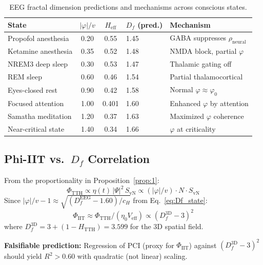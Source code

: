 \documentclass[12pt,a4paper]{article}
\newcommand{\phiTTH}{\Phi_{\mathrm{TTH}}}
\newcommand{\phiIIT}{\Phi_{\mathrm{IIT}}}
\newcommand{\SvN}{S_{\mathrm{vN}}}
\newcommand{\etacoupl}{\eta(t)}
\newcommand{\Hurst}{H_{\mathrm{TTH}}}
\numberwithin{equation}{section}
\begin{document}
\begin{table}[htbp]
\centering
\caption{EEG fractal dimension predictions and mechanisms across conscious states.}
\label{tab:states}
\begin{tabular}{lccll}
\toprule
\textbf{State} & $|\varphi|/v$ & $H_{\mathrm{eff}}$ & $D_f$ (pred.) & \textbf{Mechanism}\\
\midrule
Propofol anesthesia & 0.20 & 0.55 & 1.45 & GABA suppresses $\rho_{\mathrm{neural}}$\\
Ketamine anesthesia & 0.35 & 0.52 & 1.48 & NMDA block, partial $\varphi$\\
NREM3 deep sleep & 0.30 & 0.53 & 1.47 & Thalamic gating off\\
REM sleep & 0.60 & 0.46 & 1.54 & Partial thalamocortical\\
Eyes-closed rest & 0.90 & 0.42 & 1.58 & Normal $\varphi \approx \varphi_0$\\
Focused attention & 1.00 & 0.401 & 1.60 & Enhanced $\varphi$ by attention\\
Samatha meditation & 1.20 & 0.37 & 1.63 & Maximized $\varphi$ coherence\\
Near-critical state & 1.40 & 0.34 & 1.66 & $\varphi$ at criticality\\
\bottomrule
\end{tabular}
\end{table}

\subsection{Phi-IIT vs.\ $D_f$ Correlation}

From the proportionality in Proposition~\ref{prop:1}:
\begin{equation}
  \phiTTH \propto \etacoupl\,|\Psi|^2\,\SvN \propto (|\varphi|/v)\cdot N\cdot\SvN
  \label{eq:phi_proportional}
\end{equation}
Since $|\varphi|/v - 1 \approx \sqrt{(D_f^{\mathrm{EEG}} - 1.60)/c_H}$ from Eq.~\eqref{eq:Df_state}:
\begin{equation}
  \boxed{
  \phiIIT \approx \phiTTH / (\eta_0 V_{\mathrm{eff}}) \propto (D_f^{\mathrm{3D}} - 3)^2
  }
  \label{eq:phi_Df_correlation}
\end{equation}
where $D_f^{\mathrm{3D}} = 3 + (1-\Hurst) = 3.599$ for the 3D spatial field.

\textbf{Falsifiable prediction:} Regression of PCI (proxy for $\phiIIT$) against
$(D_f^{\mathrm{3D}} - 3)^2$ should yield $R^2 > 0.60$ with quadratic (not linear)
scaling.
\end{document}
